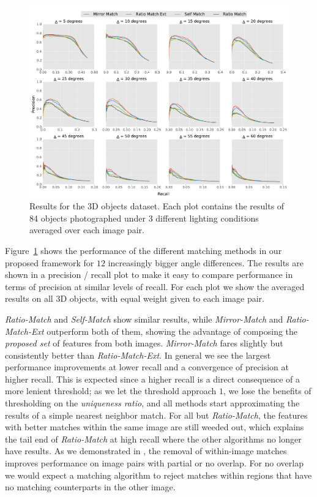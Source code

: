 \documentclass[review]{elsarticle}
\begin{document}
\begin{figure}[t]
	\centering
    \includegraphics[width=\columnwidth]{images/results_all_objects}
    \caption{Results for the 3D objects dataset. Each plot 
    contains the results of 84 objects photographed under 3 
different lighting conditions averaged over each image pair.}
    \label{fig:all_objects}
\end{figure}

Figure~\ref{fig:all_objects} shows the performance of the different matching methods in our proposed framework for $12$ increasingly bigger angle differences. The results are shown in a precision / recall plot to make it easy to compare performance in terms of precision at similar levels of recall.  For each plot we show the averaged results on all 3D objects, with equal weight given to each image pair.

\emph{Ratio-Match} and \emph{Self-Match} show similar results, while \emph{Mirror-Match} and \emph{Ratio-Match-Ext} outperform both of them, showing the advantage of composing the \emph{proposed set} of features from both images. \emph{Mirror-Match} fares slightly but consistently better than \emph{Ratio-Match-Ext}. In general we see the largest performance improvements at lower recall and a  convergence of precision at higher recall. This is expected since a higher recall is a direct consequence of a more lenient threshold; as we let the threshold approach $1$, we lose the benefits of thresholding on the \emph{uniqueness ratio}, and all methods start approximating the results of a simple nearest neighbor match. For all but \emph{Ratio-Match}, the features with better matches within the same image are still weeded out, which explains the tail end of \emph{Ratio-Match} at high recall where the other algorithms no longer have results. As we demonstrated in \cite{arnfred2013mirror}, the removal of within-image matches improves performance on image pairs with partial or no overlap. For no overlap we would expect a matching algorithm to reject matches within regions that have no matching counterparts in the other image.
\end{document}
